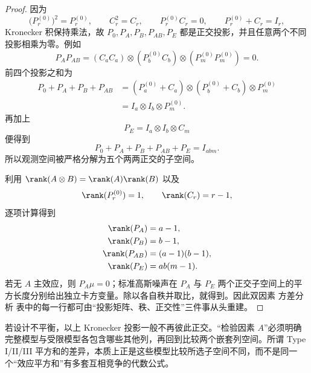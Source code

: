 \begin{proof}
因为
\[
 \bigl(P_r^{(0)}\bigr)^2=P_r^{(0)},
 \qquad
 C_r^2=C_r,
 \qquad
 P_r^{(0)}C_r=0,
 \qquad
 P_r^{(0)}+C_r=I_r,
\]
Kronecker 积保持乘法，故 $P_0,P_A,P_B,P_{AB},P_E$ 都是正交投影，并且任意两个不同投影相乘为零。例如
\[
 P_AP_{AB}
 =(C_aC_a)\otimes(P_b^{(0)}C_b)\otimes(P_m^{(0)}P_m^{(0)})=0.
\]
前四个投影之和为
\begin{align*}
 P_0+P_A+P_B+P_{AB}
 &=(P_a^{(0)}+C_a)\otimes(P_b^{(0)}+C_b)\otimes P_m^{(0)}\\
 &=I_a\otimes I_b\otimes P_m^{(0)}.
\end{align*}
再加上
\[
 P_E=I_a\otimes I_b\otimes C_m
\]
便得到
\[
 P_0+P_A+P_B+P_{AB}+P_E=I_{abm}.
\]
所以观测空间被严格分解为五个两两正交的子空间。

利用 $\rank(A\otimes B)=\rank(A)\rank(B)$ 以及
\[
 \rank(P_r^{(0)})=1,
 \qquad
 \rank(C_r)=r-1,
\]
逐项计算得到
\begin{align*}
 \rank(P_A)&=a-1,\\
 \rank(P_B)&=b-1,\\
 \rank(P_{AB})&=(a-1)(b-1),\\
 \rank(P_E)&=ab(m-1).
\end{align*}
若无 $A$ 主效应，则 $P_A\mu=0$；标准高斯噪声在 $P_A$ 与 $P_E$ 两个正交子空间上的平方长度分别给出独立卡方变量。除以各自秩并取比，就得到。因此双因素 方差分析 表中的每一行都可由“投影矩阵、秩、正交性”三件事从头重建。
\end{proof}

若设计不平衡，以上 Kronecker 投影一般不再彼此正交。“检验因素 $A$”必须明确完整模型与受限模型各包含哪些其他列，再回到比较两个嵌套列空间。所谓 Type I/II/III 平方和的差异，本质上正是这些模型比较所选子空间不同，而不是同一个“效应平方和”有多套互相竞争的代数公式。

